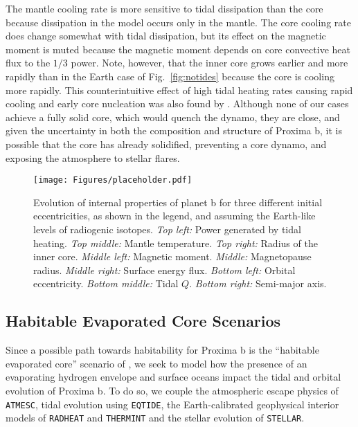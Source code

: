 \documentclass[preprint,12pt]{aastex}
\def\atmesc{\texttt{\footnotesize{ATMESC}}\xspace}
\def\eqtide{\texttt{\footnotesize{EQTIDE}}\xspace}
\def\radheat{\texttt{\footnotesize{RADHEAT}}\xspace}
\def\thermint{\texttt{\footnotesize{THERMINT}}\xspace}
\def\stellar{\texttt{\footnotesize{STELLAR}}\xspace}
\begin{document}
The mantle cooling rate is more sensitive to tidal dissipation than the core because dissipation 
in the model occurs only in the mantle.  The core cooling rate does change somewhat with tidal 
dissipation, but its effect on the magnetic moment is muted because the magnetic moment depends 
on core convective heat flux to the $1/3$ power.
 Note, however, that
the inner core grows earlier and more rapidly than in the
Earth case of Fig.~\ref{fig:notides} because the core is cooling more
rapidly. 
This counterintuitive effect of high tidal heating rates causing rapid cooling and
early core nucleation was also found by \cite{DriscollBarnes15}.
Although none of our cases achieve a fully
solid core, which would quench the dynamo, they are close, and given
the uncertainty in both the composition and structure of Proxima b, 
it is possible that the
core has already solidified, preventing a core dynamo, and exposing the atmosphere to
stellar flares.

\begin{figure} 
\begin{center}
\texttt{[image: Figures/placeholder.pdf]}
\end{center}
\caption{Evolution of internal properties of planet b for three
  different initial eccentricities, as shown in the legend, and
  assuming the Earth-like levels of radiogenic isotopes. {\it Top
    left:} Power generated by tidal heating. {\it Top middle:} Mantle
  temperature. {\it Top right:} Radius of the inner core. {\it Middle
    left:} Magnetic moment. {\it Middle:} Magnetopause radius. {\it
    Middle right:} Surface energy flux. {\it Bottom left:} Orbital
  eccentricity. {\it Bottom middle:} Tidal $Q$. {\it Bottom right:}
  Semi-major axis.}
\label{fig:tides}
\end{figure}

\subsection{Habitable Evaporated Core Scenarios}

Since a possible path towards habitability for Proxima b is the
``habitable evaporated core'' scenario of \citet{Luger15}, we seek to
model how the presence of an evaporating hydrogen envelope and surface
oceans impact the tidal and orbital evolution of Proxima b.  To do so,
we couple the atmospheric escape physics of \atmesc, tidal evolution
using \eqtide, the Earth-calibrated geophysical interior models of
\radheat and \thermint and the stellar evolution of \stellar.
\end{document}

